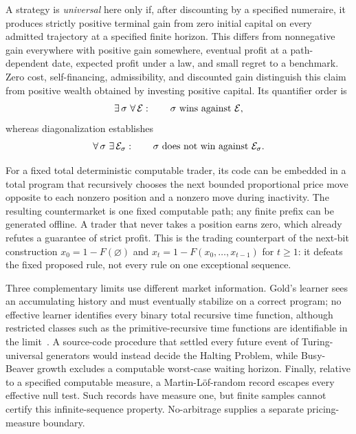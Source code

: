 \documentclass[aps,pra,reprint,superscriptaddress,amsmath,amssymb,floatfix]{revtex4-2}
\theoremstyle{plain}
\theoremstyle{definition}
\theoremstyle{remark}
\begin{document}
A strategy is \emph{universal} here only if, after discounting by a specified
numeraire, it produces strictly positive terminal gain from zero initial
capital on every admitted trajectory at a specified finite horizon. This
differs from nonnegative gain everywhere with positive gain somewhere, eventual
profit at a path-dependent date, expected profit under a law, and small regret
to a benchmark. Zero cost, self-financing,
admissibility, and discounted gain distinguish this claim from positive wealth
obtained by investing positive capital. Its quantifier order is
\begin{equation}
  \exists\,\sigma\ \forall\,\mathcal E:
  \qquad \sigma\ \hbox{wins against }\mathcal E,
  \label{eq:universalquantifiers}
\end{equation}
whereas diagonalization establishes
\begin{equation}
  \forall\,\sigma\ \exists\,\mathcal E_\sigma:
  \qquad \sigma\ \hbox{does not win against }\mathcal E_\sigma.
  \label{eq:counterquantifiers}
\end{equation}

For a fixed total deterministic computable trader, its code can be embedded in
a total program that recursively chooses the next bounded proportional price
move opposite to each nonzero position and a nonzero move during inactivity.
The resulting countermarket is one
fixed computable path; any finite prefix can be generated offline. A trader that
never takes a position earns zero, which already refutes a guarantee of strict
profit. This is the trading counterpart of the next-bit construction
\(x_0=1-F(\varnothing)\) and
\(x_t=1-F(x_0,\ldots,x_{t-1})\) for \(t\geq1\): it defeats the fixed proposed
rule, not every rule on one exceptional sequence.

Three complementary limits use different market information. Gold's learner
sees an accumulating history and must eventually stabilize on a correct
program; no effective learner identifies every binary total recursive time
function, although restricted classes such as the primitive-recursive time
functions are identifiable in the limit~\cite{go-65,go-67}. A source-code
procedure that settled every future event of Turing-universal generators would
instead decide the Halting Problem, while Busy-Beaver growth excludes a
computable worst-case waiting horizon. Finally, relative to a specified
computable measure, a Martin-L\"of-random record escapes every effective null
test. Such records have measure one, but finite samples cannot certify this
infinite-sequence property. No-arbitrage supplies a separate
pricing-measure boundary.
\end{document}
